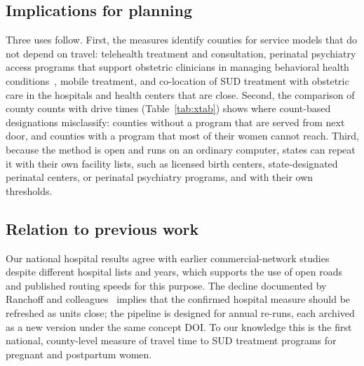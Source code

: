 \documentclass[10pt,twocolumn,letterpaper]{article}
\begin{document}
\subsection{Implications for planning}
Three uses follow. First, the measures identify counties for service models that do not depend on travel: telehealth treatment and consultation, perinatal psychiatry access programs that support obstetric clinicians in managing behavioral health conditions~\cite{byatt2016}, mobile treatment, and co-location of SUD treatment with obstetric care in the hospitals and health centers that are close. Second, the comparison of county counts with drive times (Table~\ref{tab:xtab}) shows where count-based designations misclassify: counties without a program that are served from next door, and counties with a program that most of their women cannot reach. Third, because the method is open and runs on an ordinary computer, states can repeat it with their own facility lists, such as licensed birth centers, state-designated perinatal centers, or perinatal psychiatry programs, and with their own thresholds.

\subsection{Relation to previous work}
Our national hospital results agree with earlier commercial-network studies~\cite{rayburn2012,fontenot2024} despite different hospital lists and years, which supports the use of open roads and published routing speeds for this purpose. The decline documented by Ranchoff and colleagues~\cite{ranchoff2026} implies that the confirmed hospital measure should be refreshed as units close; the pipeline is designed for annual re-runs, each archived as a new version under the same concept DOI. To our knowledge this is the first national, county-level measure of travel time to SUD treatment programs for pregnant and postpartum women.
\end{document}
